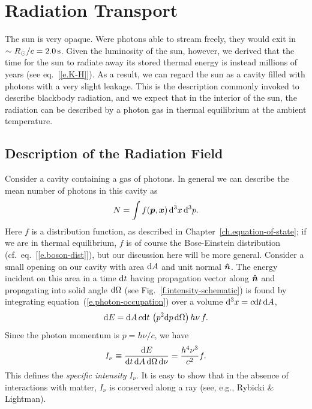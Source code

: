 \chapter{Radiation Transport}


The sun is very opaque.  Were photons able to stream freely, they would exit in $\sim R_{\odot}/c = 2.0\,\mathrm{s}$.  Given the luminosity of the sun, however, we derived that the time  for the sun to radiate away its stored thermal energy is instead millions of years (see eq.~[\ref{e.K-H}]).  As a result, we can regard the sun as a cavity filled with photons with a very slight leakage.  This is the description commonly invoked to describe blackbody radiation, and we expect that in the interior of the sun, the radiation can be described by a photon gas in thermal equilibrium at the ambient temperature.

\section{Description of the Radiation Field}\label{s.radiation-description}

Consider a cavity containing a gas of photons. In general we can describe the mean number of photons in this cavity as
\begin{equation}\label{e.photon-occupation}
 N = \int f(\bm{p},\bm{x})\,\mathrm{d}^{3}x\,\mathrm{d}^{3}p.
\end{equation}
Here $f$ is a distribution function, as described in Chapter~\ref{ch.equation-of-state}; if we are in thermal equilibrium, $f$ is of course the Bose-Einstein distribution (cf.\ eq.~[\ref{e.boson-dist}]), but our discussion here will be more general.  Consider a small opening on our cavity with area $\mathrm{d} A$ and unit normal $\bm{\hat{n}}$.  The energy incident on this area in a time $\mathrm{d} t$ having propagation vector along $\bm{\hat{n}}$ and propagating into solid angle $\mathrm{d}\Omega$ (see Fig.~\ref{f.intensity-schematic}) is found by integrating equation~(\ref{e.photon-occupation}) over a volume $\mathrm{d}^{3}x = c\mathrm{d} t\,\mathrm{d} A$,
\[
\mathrm{d} E = \mathrm{d} A\,c\mathrm{d} t\,\left( p^{2}\mathrm{d} p\,\mathrm{d}\Omega\right)  h\nu \, f.
\]
Since the photon momentum is $p = h\nu/c$, we have
\begin{equation}\label{e.specific-intensity}
I_{\nu} \equiv \frac{\mathrm{d} E}{\mathrm{d} t\,\mathrm{d} A\,\mathrm{d}\Omega\,\mathrm{d}\nu} = \frac{h^{4}\nu^{3}}{c^{2}} f.
\end{equation}
This defines the \emph{specific intensity} $I_{\nu}$.  It is easy to show that in the absence of interactions with matter, $I_{\nu}$ is conserved along a ray (see, e.g., Rybicki \& Lightman).

